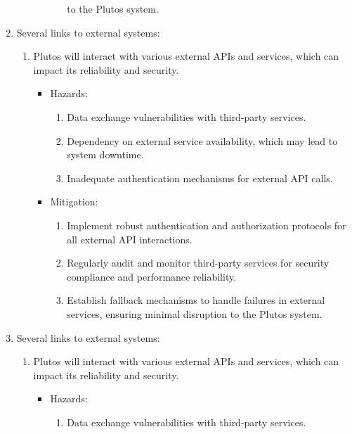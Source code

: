 \documentclass{article}
\begin{document}
\begin{enumerate}
\begin{enumerate}
\begin{itemize}
\begin{enumerate}
                    to the Plutos system.
                \end{enumerate}
        \end{itemize}
    \end{enumerate}
    \item Several links to external systems:
    \begin{enumerate}
        \item Plutos will interact with various external APIs and services, which can 
        impact its reliability and security. 
		\begin{itemize}
			\item Hazards:
				\begin{enumerate}
					\item Data exchange vulnerabilities with third-party services.
                    \item Dependency on external service availability, which may lead to system downtime.
                    \item Inadequate authentication mechanisms for external API calls.
				\end{enumerate}
			\item Mitigation:
				\begin{enumerate}
					\item Implement robust authentication and authorization protocols for all external API interactions.
                    \item Regularly audit and monitor third-party services for security compliance and performance reliability.
                    \item Establish fallback mechanisms to handle failures in external services, ensuring minimal disruption 
                    to the Plutos system.
                \end{enumerate}
        \end{itemize}
    \end{enumerate}
    \item Several links to external systems:
    \begin{enumerate}
        \item Plutos will interact with various external APIs and services, which can 
        impact its reliability and security. 
		\begin{itemize}
			\item Hazards:
				\begin{enumerate}
					\item Data exchange vulnerabilities with third-party services.

\end{enumerate}
\end{itemize}
\end{enumerate}
\end{enumerate}
\end{document}
